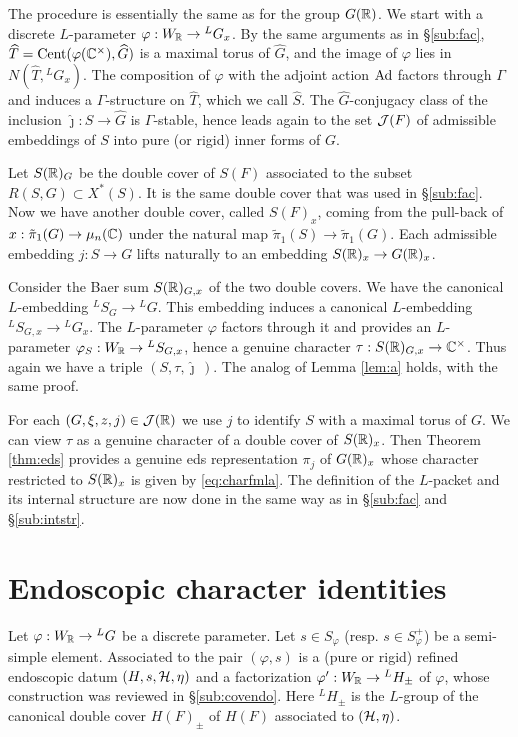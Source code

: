 \documentclass{article}
\theoremstyle{definition}
\numberwithin{equation}{section}
\renewcommand{\-}{\hyp{}}
\begin{document}
The procedure is essentially the same as for the group $G(\mathbb{R})$. We start with a discrete $L$\-parameter $\varphi : W_{\mathbb{R}} \to {^LG_x}$. By the same arguments as in \S\ref{sub:fac}, $\widehat T = \textrm{Cent}(\varphi(\mathbb{C}^\times),\widehat G)$ is a maximal torus of $\hat G$, and the image of $\varphi$ lies in $N(\hat T,{^LG_x})$. The composition of $\varphi$ with the adjoint action $\textrm{Ad}$ factors through $\Gamma$ and induces a $\Gamma$-structure on $\hat T$, which we call 
$\hat S$. The $\hat G$-conjugacy class of the inclusion $\hat\jmath : \hat S \to \hat G$ is $\Gamma$-stable, hence leads again to the set $\mathcal{J}(F)$ of admissible embeddings of $S$ into pure (or rigid) inner forms of $G$.

Let $S(\mathbb{R})_G$ be the double cover of $S(F)$ associated to the subset $R(S,G) \subset X^*(S)$. It is the same double cover that was used in \S\ref{sub:fac}. Now we have another double cover, called $S(F)_x$, coming from the pull-back of $x : \tilde\pi_1(G) \to \mu_n(\mathbb{C})$ under the natural map $\tilde\pi_1(S) \to \tilde\pi_1(G)$. Each admissible embedding $j : S \to G$ lifts naturally to an embedding $S(\mathbb{R})_x \to G(\mathbb{R})_x$.

Consider the Baer sum $S(\mathbb{R})_{G,x}$ of the two double covers. We have the canonical $L$\-embedding $^LS_G \to {^LG}$. This embedding induces a canonical $L$\-embedding ${^LS_{G,x}} \to {^LG_x}$. The $L$-parameter $\varphi$ factors through it and provides an $L$-parameter $\varphi_S : W_{\mathbb{R}} \to {^LS_{G,x}}$, hence a genuine character $\tau : S(\mathbb{R})_{G,x} \to \mathbb{C}^\times$. Thus again we have a triple $(S,\tau,\hat\jmath\,)$. The analog of Lemma \ref{lem:a} holds, with the same proof.

For each $(G,\xi,z,j) \in \mathcal{J}(\mathbb{R})$ we use $j$ to identify $S$ with a maximal torus of $G$. We can view $\tau$ as a genuine character of a double cover of $S(\mathbb{R})_x$. Then Theorem \ref{thm:eds} provides a genuine eds representation $\pi_j$ of $G(\mathbb{R})_x$ whose character restricted to $S(\mathbb{R})_x$ is given by \eqref{eq:charfmla}. The definition of the $L$-packet and its internal structure are now done in the same way as in \S\ref{sub:fac} and \S\ref{sub:intstr}.



\section{Endoscopic character identities} \label{sec:endo}

Let $\varphi : W_{\mathbb{R}} \to {^LG}$ be a discrete parameter. Let $s \in S_\varphi$ (resp. $s \in S_\varphi^+$) be a semi-simple element. Associated to the pair $(\varphi,s)$ is a (pure or rigid) refined endoscopic datum $(H,s,\mathcal{H},\eta)$ and a factorization $\varphi' : W_{\mathbb{R}} \to {^LH_\pm}$ of $\varphi$, whose construction was reviewed in \S\ref{sub:covendo}. Here $^LH_\pm$ is the $L$-group of the canonical double cover $H(F)_\pm$ of $H(F)$ associated to $(\mathcal{H},\eta)$.
\end{document}
